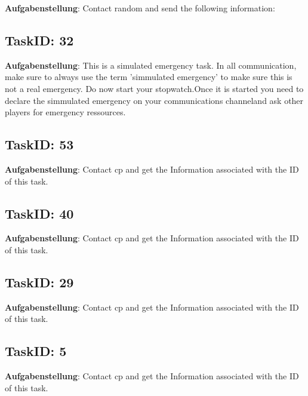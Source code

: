 \documentclass[12pt,a4paper]{scrreprt}
\begin{document}
\textbf{Aufgabenstellung}: Contact random and send the following information: \subsection{TaskID: 32}
\textbf{Aufgabenstellung}: This is a simulated emergency task. In all communication, make sure to always use the term 'simmulated emergency' to make sure this is not a real emergency. Do now start your stopwatch.Once it is started you need to declare the simmulated emergency on your communications channeland ask other players for emergency ressources.\subsection{TaskID: 53}
\textbf{Aufgabenstellung}: Contact {cp} and get the Information associated with the ID of this task.\subsection{TaskID: 40}
\textbf{Aufgabenstellung}: Contact {cp} and get the Information associated with the ID of this task.\subsection{TaskID: 29}
\textbf{Aufgabenstellung}: Contact {cp} and get the Information associated with the ID of this task.\subsection{TaskID: 5}
\textbf{Aufgabenstellung}: Contact {cp} and get the Information associated with the ID of this task.
\end{document}
